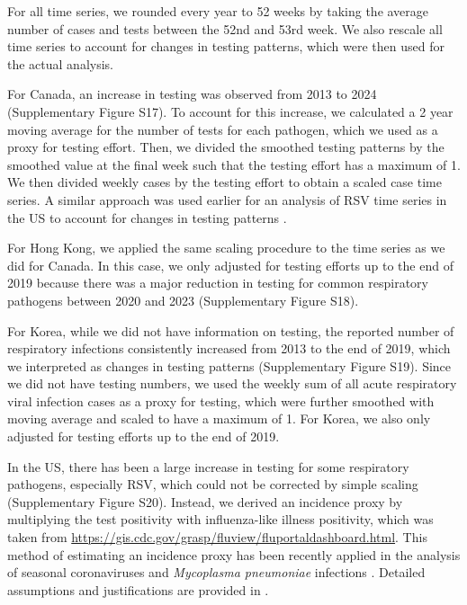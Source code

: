 \documentclass[12pt]{article}
\begin{document}
For all time series, we rounded every year to 52 weeks by taking the average number of cases and tests between the 52nd and 53rd week.
We also rescale all time series to account for changes in testing patterns, which were then used for the actual analysis.

For Canada, an increase in testing was observed from 2013 to 2024 (Supplementary Figure S17).
To account for this increase, we calculated a 2 year moving average for the number of tests for each pathogen, which we used as a proxy for testing effort.
Then, we divided the smoothed testing patterns by the smoothed value at the final week such that the testing effort has a maximum of 1.
We then divided weekly cases by the testing effort to obtain a scaled case time series.
A similar approach was used earlier for an analysis of RSV time series in the US to account for changes in testing patterns \citep{pitzer2015environmental}.

For Hong Kong, we applied the same scaling procedure to the time series as we did for Canada.
In this case, we only adjusted for testing efforts up to the end of 2019 because there was a major reduction in testing for common respiratory pathogens between 2020 and 2023 (Supplementary Figure S18).

For Korea, while we did not have information on testing, the reported number of respiratory infections consistently increased from 2013 to the end of 2019, which we interpreted as changes in testing patterns (Supplementary Figure S19).
Since we did not have testing numbers, we used the weekly sum of all acute respiratory viral infection cases as a proxy for testing, which were further smoothed with moving average and scaled to have a maximum of 1.
For Korea, we also only adjusted for testing efforts up to the end of 2019.

In the US, there has been a large increase in testing for some respiratory pathogens, especially RSV, which could not be corrected by simple scaling (Supplementary Figure S20).
Instead, we derived an incidence proxy by multiplying the test positivity with influenza-like illness positivity, which was taken from \url{https://gis.cdc.gov/grasp/fluview/fluportaldashboard.html}.
This method of estimating an incidence proxy has been recently applied in the analysis of seasonal coronaviruses \citep{kissler2020projecting} and \textit{Mycoplasma pneumoniae} infections \citep{park2024predicting}.
Detailed assumptions and justifications are provided in \citep{goldstein2011predicting}.
\end{document}
